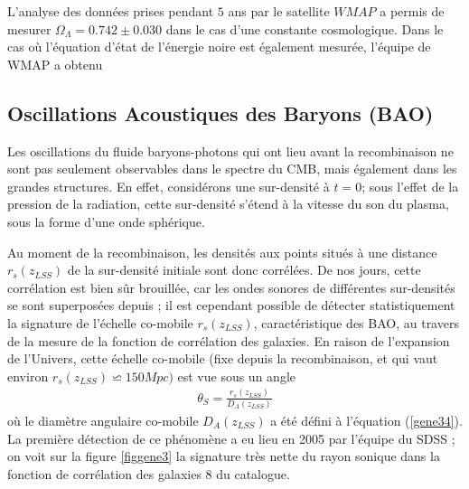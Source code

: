 \documentclass[a4paper,12pt]{report}
\theoremstyle{plain}
\theoremstyle{plain}
\begin{document}
L'analyse des donn\'ees prises pendant $5$ ans \cite{177} par le satellite $WMAP$ a permis de
mesurer $ \Omega_\Lambda = 0.742 \pm 0.030 $ dans le cas d'une constante cosmologique. Dans le cas o\`u
l'\'equation d'\'etat de l'\'energie noire est \'egalement mesur\'ee, l'\'equipe de WMAP a obtenu
 
 \subsection{Oscillations Acoustiques des Baryons (BAO)}
 Les oscillations du fluide baryons-photons qui ont lieu avant la recombinaison ne sont
pas seulement observables dans le spectre du CMB, mais \'egalement dans les grandes 
structures. En effet, consid\'erons une sur-densit\'e \`a $ t = 0$; sous l'effet de la pression de la radiation,
cette sur-densit\'e s'\'etend \`a la vitesse du son du plasma, sous la forme d'une onde sph\'erique.

Au moment de la recombinaison, les densit\'es aux points situ\'es \`a une distance $ r_s (z_{LSS} )$
de la sur-densit\'e initiale sont donc corr\'el\'ees. De nos jours, cette corr\'elation est bien s\^ur
brouill\'ee, car les ondes sonores de diff\'erentes sur-densit\'es se sont superpos\'ees depuis ; il est
cependant possible de d\'etecter statistiquement la signature de l'\'echelle co-mobile $ r_s (z_{LSS} )$,
caract\'eristique des BAO, au travers de la mesure de la fonction de corr\'elation des galaxies.
En raison de l'expansion de l'Univers, cette \'echelle co-mobile (fixe depuis la recombinaison,
et qui vaut environ $ r_s (z_{LSS} ) \backsimeq 150 Mpc) $ est vue sous un angle
\begin{eqnarray}
 \theta_S = \frac{ r_s (z_{LSS} ) }{ D_A(z_{LSS} ) } \label{gene35}
\end{eqnarray}
o\`u le diam\`etre angulaire co-mobile $ D_A(z_{LSS} )$ a \'et\'e d\'efini \`a l'\'equation (\ref{gene34}). La premi\`ere
d\'etection de ce ph\'enom\`ene a eu lieu en 2005 par l'\'equipe du SDSS  \cite{115}; on voit sur
la figure \ref{figgene3} la signature tr\`es nette du rayon sonique dans la fonction de corr\'elation des
galaxies 8 du catalogue.

% 
\end{document}
